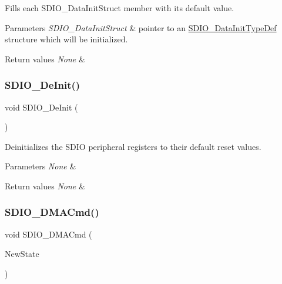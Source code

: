 Fills each S\+D\+I\+O\+\_\+\+Data\+Init\+Struct member with its default value. 


\begin{DoxyParams}{Parameters}
{\em S\+D\+I\+O\+\_\+\+Data\+Init\+Struct} & pointer to an \mbox{\hyperlink{struct_s_d_i_o___data_init_type_def}{S\+D\+I\+O\+\_\+\+Data\+Init\+Type\+Def}} structure which will be initialized. \\
\hline
\end{DoxyParams}

\begin{DoxyRetVals}{Return values}
{\em None} & \\
\hline
\end{DoxyRetVals}
\mbox{\label{group___s_d_i_o___private___functions_gac359d2c6c67a2590f8f9b720c0e4ff1b}} 
\subsubsection{\texorpdfstring{SDIO\_DeInit()}{SDIO\_DeInit()}}
{\footnotesize\ttfamily void S\+D\+I\+O\+\_\+\+De\+Init (\begin{DoxyParamCaption}\item[{void}]{ }\end{DoxyParamCaption})}



Deinitializes the S\+D\+IO peripheral registers to their default reset values. 


\begin{DoxyParams}{Parameters}
{\em None} & \\
\hline
\end{DoxyParams}

\begin{DoxyRetVals}{Return values}
{\em None} & \\
\hline
\end{DoxyRetVals}
\mbox{\label{group___s_d_i_o___private___functions_gad36fde5ec0ce0c2089b9d971c2271e6e}} 
\subsubsection{\texorpdfstring{SDIO\_DMACmd()}{SDIO\_DMACmd()}}
{\footnotesize\ttfamily void S\+D\+I\+O\+\_\+\+D\+M\+A\+Cmd (\begin{DoxyParamCaption}\item[{\mbox{\hyperlink{group___exported__types_gac9a7e9a35d2513ec15c3b537aaa4fba1}{Functional\+State}}}]{New\+State }\end{DoxyParamCaption})}



